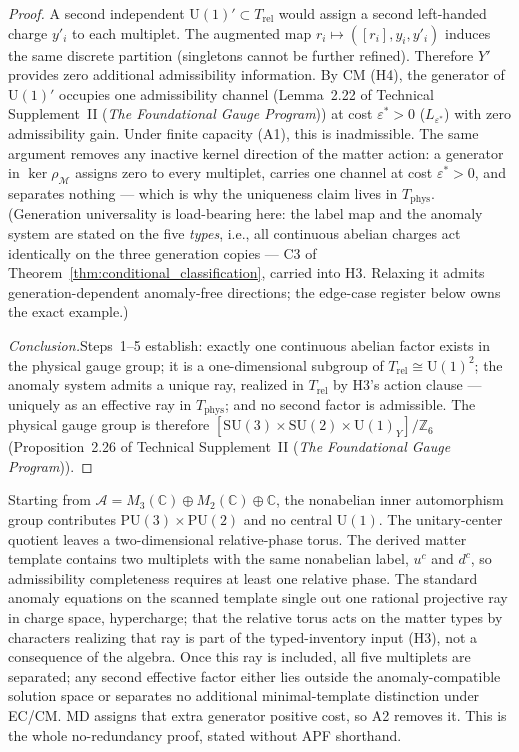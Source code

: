 \documentclass[11pt]{article}
\theoremstyle{definition}
\newcommand{\SU}{\mathrm{SU}}
\newcommand{\U}{\mathrm{U}}
\newcommand{\TSII}{Technical Supplement~II (\emph{The Foundational Gauge Program})}
\begin{document}
\begin{proof}
A second independent $\U(1)'\subset T_{\mathrm{rel}}$ would assign
a second left-handed charge $y'_i$ to each multiplet.  The augmented
map $r_i\mapsto([r_i],y_i,y'_i)$ induces the same discrete
partition (singletons cannot be further refined).  Therefore $Y'$
provides zero additional admissibility information.  By CM (H4), the
generator of $\U(1)'$ occupies one admissibility channel
(Lemma~2.22 of \TSII{}) at cost $\varepsilon^* > 0$
($L_{\varepsilon^*}$) with zero admissibility gain.  Under finite
capacity (A1), this is inadmissible.  The same argument removes any
inactive kernel direction of the matter action: a generator in
$\ker\rho_{\mathcal{M}}$ assigns zero to every multiplet, carries
one channel at cost $\varepsilon^* > 0$, and separates nothing ---
which is why the uniqueness claim lives in $T_{\mathrm{phys}}$.
(Generation universality is
load-bearing here: the label map and the anomaly system are stated on
the five \emph{types}, i.e., all continuous abelian charges act
identically on the three generation copies --- C3 of
Theorem~\ref{thm:conditional_classification}, carried into H3.
Relaxing it admits generation-dependent anomaly-free directions; the
edge-case register below owns the exact example.)

\textit{Conclusion.}\quad Steps~1--5 establish: exactly one
continuous abelian factor exists in the physical gauge group; it is a
one-dimensional subgroup of $T_{\mathrm{rel}} \cong \mathrm{U}(1)^2$;
the anomaly system admits a unique ray, realized in
$T_{\mathrm{rel}}$ by H3's action clause --- uniquely as an effective
ray in $T_{\mathrm{phys}}$; and no second factor is
admissible.  The physical gauge group is therefore
$[\SU(3) \times \SU(2) \times \U(1)_Y] / \mathbb{Z}_6$
(Proposition~2.26 of \TSII{}).
\end{proof}

\begin{tcolorbox}[apfbox, title={Unique $\U(1)$ proof in conventional language}]
\footnotesize
Starting from $\mathcal A=M_3(\mathbb C)\oplus M_2(\mathbb C)\oplus\mathbb C$, the nonabelian inner automorphism group contributes $\mathrm{PU}(3)\times\mathrm{PU}(2)$ and no central $\U(1)$.  The unitary-center quotient leaves a two-dimensional relative-phase torus.  The derived matter template contains two multiplets with the same nonabelian label, $u^c$ and $d^c$, so admissibility completeness requires at least one relative phase.  The standard anomaly equations on the scanned template single out one rational projective ray in charge space, hypercharge; that the relative torus acts on the matter types by characters realizing that ray is part of the typed-inventory input (H3), not a consequence of the algebra.  Once this ray is included, all five multiplets are separated; any second effective factor either lies outside the anomaly-compatible solution space or separates no additional minimal-template distinction under EC/CM.  MD assigns that extra generator positive cost, so A2 removes it.  This is the whole no-redundancy proof, stated without APF shorthand.
\end{tcolorbox}
\end{document}
